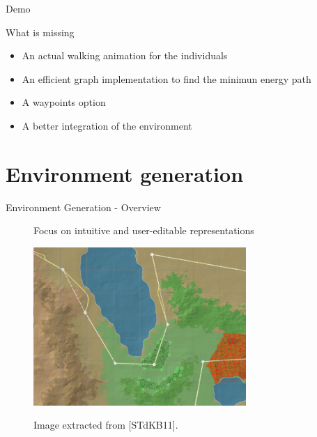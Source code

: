 \documentclass{beamer}
\begin{document}
\begin{frame}{Demo}
\end{frame}

\begin{frame}{What is missing}
  \begin{itemize}
  \item An actual walking animation for the individuals
  \item An efficient graph implementation to find the minimun energy path
  \item A waypoints option
  \item A better integration of the environment 
  \end{itemize}
\end{frame}

\section{Environment generation}
\begin{frame}{Environment Generation - Overview}
  \begin{figure}
    \begin{center}
      Focus on intuitive and user-editable representations

      \includegraphics[height=6cm]{input_map.png}

      \tiny Image extracted from [STdKB11].
    \end{center}
  \end{figure}
\end{frame}
\end{document}
